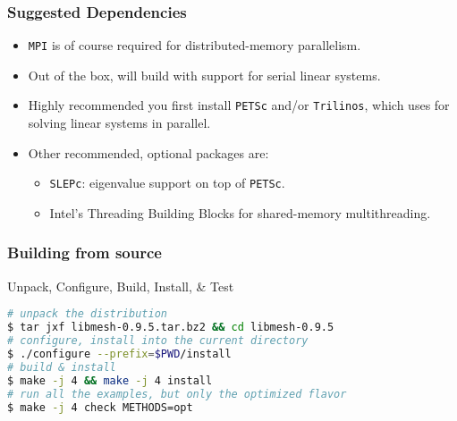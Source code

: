 \begin{frame}
  \frametitle{\libMesh{} Suggested Dependencies}
  \begin{itemize}
    \item  \texttt{MPI} is of course required for distributed-memory parallelism.
    \item Out of the box, \libMesh{} will build with support for serial linear systems.
    \item Highly recommended you first install \texttt{PETSc} and/or \texttt{Trilinos}, which \libMesh{} uses for solving linear systems in parallel.
      \item Other recommended, optional packages are:
        \begin{itemize}
          \item \texttt{SLEPc}: eigenvalue support on top of \texttt{PETSc}.
          \item Intel's Threading Building Blocks for shared-memory multithreading.
        \end{itemize}
  \end{itemize}
\end{frame}

\begin{frame}[fragile]
  \frametitle{Building \libMesh{} from source}

  \begin{block}{Unpack, Configure, Build, Install, \& Test}
    \begin{lstlisting}[language=bash]
# unpack the distribution
$ tar jxf libmesh-0.9.5.tar.bz2 && cd libmesh-0.9.5
# configure, install into the current directory
$ ./configure --prefix=$PWD/install
# build & install
$ make -j 4 && make -j 4 install
# run all the examples, but only the optimized flavor
$ make -j 4 check METHODS=opt
    \end{lstlisting}
  \end{block}
\end{frame}



